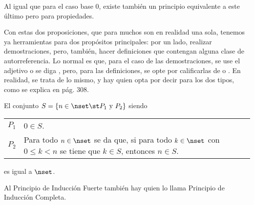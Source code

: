 Al igual que para el caso base 0, existe también un principio equivalente a
este último pero para propiedades.



Con estas dos proposiciones, que para muchos son en realidad una sola,
tenemos ya herramientas para dos propósitos principales: por un lado,
realizar demostraciones, pero, también, hacer definiciones que contengan
alguna clase de autorreferencia. Lo normal es que, para el caso de las
demostraciones, se use el adjetivo  o se diga , pero, para las definiciones, se opte por calificarlas de
 o . En realidad, se trata de lo mismo, y
hay quien opta por decir  para los dos tipos, como se
explica en \cite{stillwell-elem-maths} pág. 308.





\begin{theorem}
  El conjunto $S = \{n \in \nset \st P_1 \ \text{y} \ P_2\}$ siendo

  \begin{center}
    \begin{tabular}{l p{}}
      $P_1$ & $0 \in S$. \\
      $P_2$ & Para todo $n \in \nset$ se da que, si para todo $k \in \nset$
        con $0 \leq k < n$ se tiene que $k \in S$, entonces $n \in S$.
    \end{tabular}
  \end{center}

  \noindent es igual a $\nset$.
\end{theorem}

Al Principio de Inducción Fuerte también hay quien lo llama Principio de
Inducción Completa.

